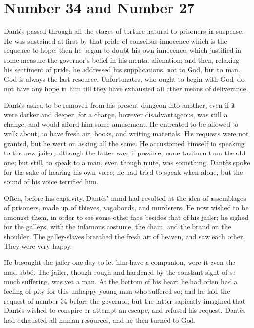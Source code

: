 \chapter{Number 34 and Number 27}

Dantès passed through all the stages of torture natural to prisoners in
suspense. He was sustained at first by that pride of conscious
innocence which is the sequence to hope; then he began to doubt his own
innocence, which justified in some measure the governor’s belief in his
mental alienation; and then, relaxing his sentiment of pride, he
addressed his supplications, not to God, but to man. God is always the
last resource. Unfortunates, who ought to begin with God, do not have
any hope in him till they have exhausted all other means of
deliverance.

Dantès asked to be removed from his present dungeon into another, even
if it were darker and deeper, for a change, however disadvantageous,
was still a change, and would afford him some amusement. He entreated
to be allowed to walk about, to have fresh air, books, and writing
materials. His requests were not granted, but he went on asking all the
same. He accustomed himself to speaking to the new jailer, although the
latter was, if possible, more taciturn than the old one; but still, to
speak to a man, even though mute, was something. Dantès spoke for the
sake of hearing his own voice; he had tried to speak when alone, but
the sound of his voice terrified him.

Often, before his captivity, Dantès’ mind had revolted at the idea of
assemblages of prisoners, made up of thieves, vagabonds, and murderers.
He now wished to be amongst them, in order to see some other face
besides that of his jailer; he sighed for the galleys, with the
infamous costume, the chain, and the brand on the shoulder. The
galley-slaves breathed the fresh air of heaven, and saw each other.
They were very happy.

He besought the jailer one day to let him have a companion, were it
even the mad abbé. The jailer, though rough and hardened by the
constant sight of so much suffering, was yet a man. At the bottom of
his heart he had often had a feeling of pity for this unhappy young man
who suffered so; and he laid the request of number 34 before the
governor; but the latter sapiently imagined that Dantès wished to
conspire or attempt an escape, and refused his request. Dantès had
exhausted all human resources, and he then turned to God.

